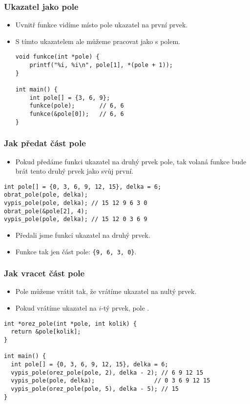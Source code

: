 \documentclass{beamer}
\newenvironment{itemizex}%
  {\large \begin{itemize}%
    \setlength{\itemsep}{8pt}%
    \setlength{\parskip}{8pt}}%
  {\end{itemize}}
\begin{document}
\begin{frame}[t,fragile]\frametitle{Ukazatel jako pole} 
    \begin{itemizex}
        \item Uvnitř funkce vidíme místo pole ukazatel na první prvek.
        \item S tímto ukazatelem ale můžeme pracovat jako s polem.
        \begin{verbatim} 
void funkce(int *pole) {
    printf("%i, %i\n", pole[1], *(pole + 1));
}

int main() {
    int pole[] = {3, 6, 9};
    funkce(pole);       // 6, 6
    funkce(&pole[0]);   // 6, 6
}
        \end{verbatim}
    \end{itemizex}
\end{frame}


\begin{frame}[t,fragile]\frametitle{Jak předat část pole} 
\begin{itemizex}
    \item Pokud předáme funkci ukazatel na druhý prvek pole, tak volaná funkce bude brát tento druhý prvek jako svůj první.
\end{itemizex}

\begin{verbatim} 
int pole[] = {0, 3, 6, 9, 12, 15}, delka = 6;
obrat_pole(pole, delka);
vypis_pole(pole, delka); // 15 12 9 6 3 0
obrat_pole(&pole[2], 4);
vypis_pole(pole, delka); // 15 12 0 3 6 9 
\end{verbatim}

\begin{itemizex}
    \item Předali jsme funkci ukazatel na druhý prvek.
    \item Funkce tak  jen část pole: \texttt{\{9, 6, 3, 0\}}.
\end{itemizex}
\end{frame}


\begin{frame}[t,fragile]\frametitle{Jak vracet část pole} 
    \begin{itemizex}
        \item Pole můžeme vrátit tak, že vrátíme ukazatel na nultý prvek.
        \item Pokud vrátíme ukazatel na $i$-tý prvek, pole .
    \end{itemizex}

    \begin{verbatim} 
int *orez_pole(int *pole, int kolik) {
  return &pole[kolik];
}

int main() {
  int pole[] = {0, 3, 6, 9, 12, 15}, delka = 6;
  vypis_pole(orez_pole(pole, 2), delka - 2); // 6 9 12 15 
  vypis_pole(pole, delka);                 // 0 3 6 9 12 15 
  vypis_pole(orez_pole(pole, 5), delka - 5); // 15 
}
    \end{verbatim}
\end{frame}
\end{document}
